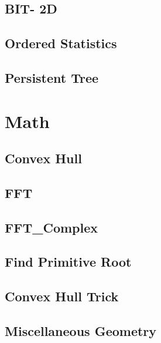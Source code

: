 \documentclass[12pt]{extarticle}
\begin{document}
\begin{multicols*}{2}
\subsection{BIT- 2D} %


\subsection{Ordered Statistics} %

\subsection{Persistent Tree} %


\section{Math}

\subsection{Convex Hull} %


\subsection{FFT} %


\subsection{FFT\_Complex} %


\subsection{Find Primitive Root } %


\subsection{Convex Hull Trick} %



\subsection{Miscellaneous Geometry} %



\end{multicols*}
\end{document}
